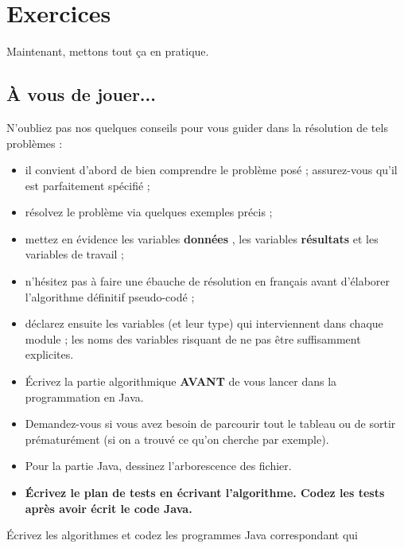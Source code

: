 \documentclass[11pt,a4paper]{article}
\begin{document}
            \par
        \section{Exercices}
				Maintenant, mettons tout \c ca en pratique.
      
            \par
        \subsection{\`A vous de jouer...}
          N'oubliez pas nos quelques conseils pour vous guider dans la r\'esolution de tels probl\`emes :
          
					\begin{itemize}
				
			\item il convient d'abord de bien comprendre le probl\`eme pos\'e ; assurez-vous qu'il est parfaitement sp\'ecifi\'e ;
			\item r\'esolvez le probl\`eme via quelques exemples pr\'ecis ;
			\item mettez en \'evidence les variables \textbf{\guillemotleft  donn\'ees \guillemotright }, les variables \textbf{\guillemotleft  r\'esultats \guillemotright } et les variables de travail ;
			\item n'h\'esitez pas \`a faire une \'ebauche de r\'esolution en fran\c cais avant d'\'elaborer l'algorithme d\'efinitif pseudo-cod\'e ;
			\item d\'eclarez ensuite les variables (et leur type) qui interviennent dans chaque module ; les noms des variables risquant de ne pas \^etre suffisamment explicites.
			\item \'Ecrivez la partie algorithmique \textbf{AVANT} de vous lancer dans la programmation en Java.
			\item Demandez-vous si vous avez besoin de parcourir tout le tableau ou de sortir pr\'ematur\'ement (si on a trouv\'e ce qu'on cherche par exemple).
			\item Pour la partie Java, dessinez l'arborescence des fichier. 
			\item \textbf{\'Ecrivez le plan de tests en \'ecrivant l'algorithme. Codez les tests apr\`es avoir \'ecrit le code Java.}
					\end{itemize}
				
            \par
        
        \'Ecrivez les algorithmes et codez les programmes Java correspondant qui 
          
\end{document}
